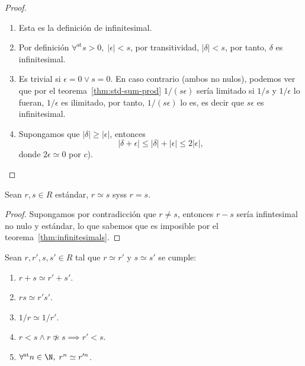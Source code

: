 \documentclass[11pt,oneside,a4paper]{book}
\DeclareMathOperator{\st}{st}
\newcommand{\forallst}{\forall^{\st}}
\begin{document}
\begin{proof}
\begin{enumerate}[$a$)]
\item Esta es la definición de infinitesimal.
\item Por definición $\forallst s\gt 0,\;|\epsilon|\lt s$, por transitividad, $|\delta|\lt s$, por tanto, $\delta$ es infinitesimal.
\item Es trivial si $\epsilon=0\vee s=0$. En caso contrario (ambos no nulos), podemos ver que por el teorema~\ref{thm:std-sum-prod} $1/(s\epsilon)$ sería limitado si $1/s$ y $1/\epsilon$ lo fueran, $1/\epsilon$ es ilimitado, por tanto, $1/(s\epsilon)$ lo es, es decir que $s\epsilon$ es infinitesimal.
\item Supongamos que $|\delta|\geq|\epsilon|$, entonces
$$|\delta+\epsilon|\leq|\delta|+|\epsilon|\leq 2|\epsilon|,$$
donde $2\epsilon\simeq 0$ por $c$).
\end{enumerate}
\end{proof}
\begin{thm}
Sean $r,s\in R$ estándar, $r\simeq s$ syss $r=s$.
\end{thm}
\begin{proof}
Supongamos por contradicción que $r\neq s$, entonces $r-s$ sería infintesimal no nulo y estándar, lo que sabemos que es imposible por el teorema~\ref{thm:infinitesimals}.
\end{proof}
\begin{thm}\label{thm:inf-close-nsa}
Sean $r,r',s,s'\in R$ tal que $r\simeq r'$ y $s\simeq s'$ se cumple:
\begin{enumerate}[$a$)]
\item $r+s\simeq r'+s'$.
\item $rs\simeq r's'$.
\item $1/r\simeq 1/r'$.
\item $r\lt s\wedge r\not\simeq s\implies r'\lt s$.
\item $\forallst n\in\N,\;r^n\simeq r'^n$.
\end{enumerate}
\end{thm}
\end{document}
